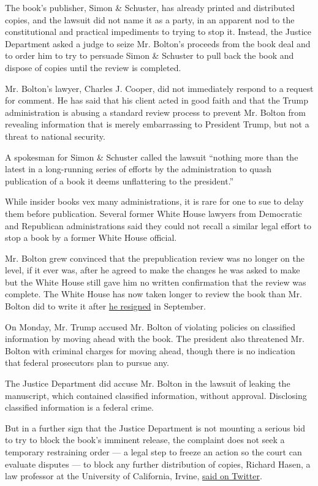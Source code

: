 The book's publisher, Simon \& Schuster, has already printed and
distributed copies, and the lawsuit did not name it as a party, in an
apparent nod to the constitutional and practical impediments to trying
to stop it. Instead, the Justice Department asked a judge to seize Mr.
Bolton's proceeds from the book deal and to order him to try to persuade
Simon \& Schuster to pull back the book and dispose of copies until the
review is completed.

Mr. Bolton's lawyer, Charles J. Cooper, did not immediately respond to a
request for comment. He has said that his client acted in good faith and
that the Trump administration is abusing a standard review process to
prevent Mr. Bolton from revealing information that is merely
embarrassing to President Trump, but not a threat to national security.

A spokesman for Simon \& Schuster called the lawsuit ``nothing more than
the latest in a long-running series of efforts by the administration to
quash publication of a book it deems unflattering to the president.''

While insider books vex many administrations, it is rare for one to sue
to delay them before publication. Several former White House lawyers
from Democratic and Republican administrations said they could not
recall a similar legal effort to stop a book by a former White House
official.

Mr. Bolton grew convinced that the prepublication review was no longer
on the level, if it ever was, after he agreed to make the changes he was
asked to make but the White House still gave him no written confirmation
that the review was complete. The White House has now taken longer to
review the book than Mr. Bolton did to write it after
\href{https://www.nytimes.com/2019/09/10/us/politics/john-bolton-national-security-adviser-trump.html}{he
resigned} in September.

On Monday, Mr. Trump accused Mr. Bolton of violating policies on
classified information by moving ahead with the book. The president also
threatened Mr. Bolton with criminal charges for moving ahead, though
there is no indication that federal prosecutors plan to pursue any.

The Justice Department did accuse Mr. Bolton in the lawsuit of leaking
the manuscript, which contained classified information, without
approval. Disclosing classified information is a federal crime.

But in a further sign that the Justice Department is not mounting a
serious bid to try to block the book's imminent release, the complaint
does not seek a temporary restraining order --- a legal step to freeze
an action so the court can evaluate disputes --- to block any further
distribution of copies, Richard Hasen, a law professor at the University
of California, Irvine,
\href{https://twitter.com/rickhasen/status/1273007151938592768}{said on
Twitter}.

